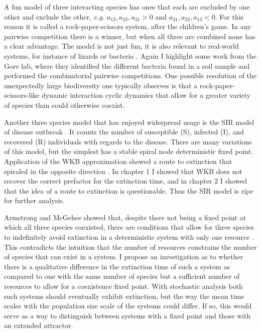 A fun model of three interacting species has ones that each are excluded by one other and exclude the other, \emph{e.g.} $a_{12},a_{23},a_{31}>0$ and $a_{21},a_{32},a_{13}<0$.  
For this reason it is called a rock-paper-scissors system, after the children's game. 
In any pairwise competition there is a winner, but when all three are combined none has a clear advantage. 
The model is not just fun, it is also relevant to real-world systems, for instance of lizards \cite{???} or bacteria \cite{???}. 
Again I highlight some work from the Gore lab, where they identified the different bacteria found in a soil sample and performed the combinatorial pairwise competitions. 
One possible resolution of the unexpectedly large biodiversity one typically observes is that a rock-paper-scissors-like dynamic interaction cyclic dynamics that allow for a greater variety of species than could otherwise coexist. 

Another three species model that has enjoyed widespread usage is the SIR model of disease outbreak \cite{???}. 
It counts the number of susceptible (S), infected (I), and recovered (R) individuals with regards to the disease. 
There are many variations of this model, but the simplest has a stable spiral node deterministic fixed point. 
Application of the WKB approximation showed a route to extinction that spiraled in the opposite direction \cite{???}. 
In chapter 1 I showed that WKB does not recover the correct prefactor for the extinction time, and in chapter 2 I showed that the idea of a route to extinction is questionable. 
Thus the SIR model is ripe for further analysis. 

Armstrong and McGehee showed that, despite there not being a fixed point at which all three species coexisted, there are conditions that allow for three species to indefinitely avoid extinction in a deterministic system with only one resource \cite{Armstrong1976,Smale1976}. 
This contradicts the intuition that the number of resources constrains the number of species that can exist in a system. 
I propose an investigation as to whether there is a qualitative difference in the extinction time of such a system as compared to one with the same number of species but a sufficient number of resources to allow for a coexistence fixed point. 
With stochastic analysis both such systems should eventually exhibit extinction, but the way the mean time scales with the population size scale of the systems could differ. 
If so, this would serve as a way to distinguish between systems with a fixed point and those with an extended attractor. 


